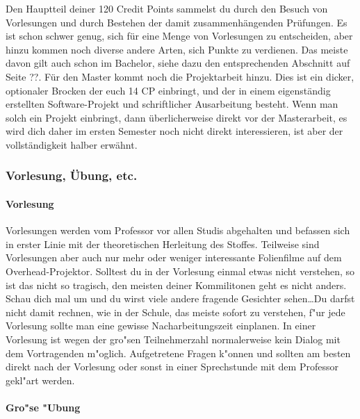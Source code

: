 \begin{multicols}{2}

Den Hauptteil deiner 120 Credit Points sammelst du durch den Besuch von Vorlesungen und durch Bestehen der damit zusammenhängenden Prüfungen. Es ist schon schwer genug, sich für eine Menge von Vorlesungen zu entscheiden, aber hinzu kommen noch diverse andere Arten, sich Punkte zu verdienen. Das meiste davon gilt auch schon im Bachelor, siehe dazu den entsprechenden Abschnitt auf Seite ??. Für den Master kommt noch die Projektarbeit hinzu. Dies ist ein dicker, optionaler Brocken der euch 14 CP einbringt, und der in einem eigenständig erstellten Software-Projekt und schriftlicher Ausarbeitung besteht. Wenn man solch ein Projekt einbringt, dann überlicherweise direkt vor der Masterarbeit, es wird dich daher im ersten Semester noch nicht direkt interessieren, ist aber der vollständigkeit halber erwähnt.

\subsubsection{Vorlesung, Übung, etc.}
\paragraph*{Vorlesung}

Vorlesungen werden vom Professor vor allen Studis abgehalten und befassen
sich in erster Linie mit der theoretischen Herleitung des Stoffes. Teilweise
sind Vorlesungen aber auch nur mehr oder weniger interessante Folienfilme auf
dem Overhead-Projektor. Solltest du in der Vorlesung einmal etwas nicht
verstehen, so ist das nicht so tragisch, den meisten deiner Kommilitonen geht
es nicht anders. Schau dich mal um und du wirst viele andere fragende Gesichter
sehen\ldots Du darfst nicht damit rechnen, wie in der Schule, das meiste sofort zu
verstehen, f"ur jede Vorlesung sollte man eine gewisse Nacharbeitungszeit
einplanen. In einer Vorlesung ist wegen der gro"sen Teilnehmerzahl
normalerweise kein Dialog mit dem Vortragenden m"oglich. Aufgetretene Fragen
k"onnen und sollten am besten direkt nach der Vorlesung oder sonst in einer
Sprechstunde mit dem Professor gekl"art werden.


\paragraph*{Gro"se "Ubung}


\end{multicols}
